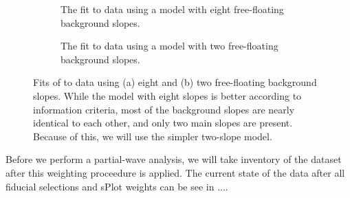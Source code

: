 




\begin{figure}
  \begin{center}
    \begin{subfigure}[t]{\textwidth}
        \begin{center}
          
        \caption{The fit to data using a model with eight free-floating background slopes.}
        \end{center}
        \end{subfigure}
        \begin{subfigure}[t]{\textwidth}
          \begin{center}
            
        \caption{The fit to data using a model with two free-floating background slopes.}
          \end{center}
        \end{subfigure}
        \caption{Fits of  to data using (a) eight and (b) two free-floating background slopes. While the model with eight slopes is better according to information criteria, most of the background slopes are nearly identical to each other, and only two main slopes are present. Because of this, we will use the simpler two-slope model.}\label{fig:splot-fits}
\end{center}
\end{figure}

Before we perform a partial-wave analysis, we will take inventory of the dataset after this weighting proceedure is applied. The current state of the data after all fiducial selections and sPlot weights can be see in ....

